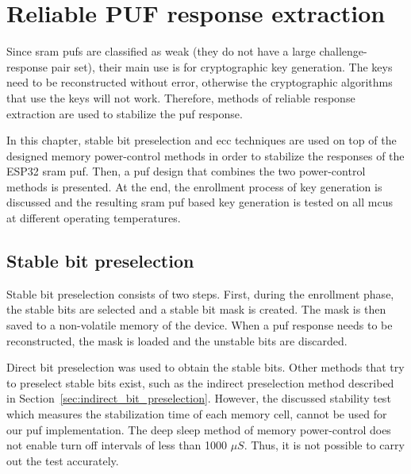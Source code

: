 \chapter{Reliable PUF response extraction}\label{sec:response_extraction} %

Since \gls{sram} \glspl{puf} are classified as weak (they do not have a large challenge-response pair set), their main use is for cryptographic key generation. The keys need to be reconstructed without error, otherwise the cryptographic algorithms that use the keys will not work. Therefore, methods of reliable response extraction are used to stabilize the \gls{puf} response.

In this chapter, stable bit preselection and \gls{ecc} techniques are used on top of the designed memory power-control methods in order to stabilize the responses of the ESP32 \gls{sram} \gls{puf}. Then, a \gls{puf} design that combines the two power-control methods is presented. At the end, the enrollment process of key generation is discussed and the resulting \gls{sram} \gls{puf} based key generation is tested on all \glspl{mcu} at different operating temperatures.

\section{Stable bit preselection}

Stable bit preselection consists of two steps. First, during the enrollment phase, the stable bits are selected and a stable bit mask is created. The mask is then saved to a non-volatile memory of the device. When a \gls{puf} response needs to be reconstructed, the mask is loaded and the unstable bits are discarded.

Direct bit preselection was used to obtain the stable bits. Other methods that try to preselect stable bits exist, such as the indirect preselection method described in Section~\ref{sec:indirect_bit_preselection}. However, the discussed stability test which measures the stabilization time of each memory cell, cannot be used for our \gls{puf} implementation. The deep sleep method of memory power-control does not enable turn off intervals of less than 1000 $\mu{}S$. Thus, it is not possible to carry out the test accurately.

